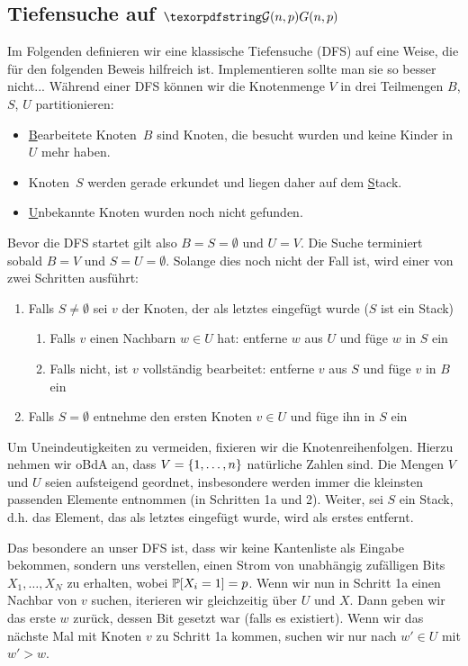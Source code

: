 \subsection{Tiefensuche auf $\Gnp$}
Im Folgenden definieren wir eine klassische Tiefensuche (DFS) auf eine Weise, die für den folgenden Beweis hilfreich ist.
Implementieren sollte man sie so besser nicht...
Während einer DFS können wir die Knotenmenge $V$ in drei Teilmengen $B$, $S$, $U$ partitionieren:
\begin{itemize}
    \item \underline Bearbeitete Knoten~$B$ sind Knoten, die besucht wurden und keine Kinder in $U$ mehr haben.
    \item Knoten~$S$ werden gerade erkundet und liegen daher auf dem \underline Stack.
    \item \underline Unbekannte Knoten wurden noch nicht gefunden.
\end{itemize}

Bevor die DFS startet gilt also $B = S = \emptyset$ und $U = V$.
Die Suche terminiert sobald $B = V$ und $S = U = \emptyset$.
Solange dies noch nicht der Fall ist, wird einer von zwei Schritten ausführt:

\begin{enumerate}
    \item Falls $S \ne \emptyset$ sei $v$ der Knoten, der als letztes eingefügt wurde ($S$ ist ein Stack)
          \begin{enumerate}
              \item Falls $v$ einen Nachbarn $w \in U$ hat: entferne $w$ aus $U$ und füge $w$ in $S$ ein
              \item Falls nicht, ist $v$ vollständig bearbeitet: entferne $v$ aus $S$ und füge $v$ in $B$ ein
          \end{enumerate}
    \item Falls $S = \emptyset$ entnehme den ersten Knoten $v \in U$ und füge ihn in $S$ ein
\end{enumerate}

Um Uneindeutigkeiten zu vermeiden, fixieren wir die Knotenreihenfolgen.
Hierzu nehmen wir oBdA an, dass $V = \left\{1, \ldots, n\right\}$ natürliche Zahlen sind.
Die Mengen $V$ und $U$ seien aufsteigend geordnet, insbesondere werden immer die kleinsten passenden Elemente entnommen (in Schritten 1a und 2).
Weiter, sei $S$ ein Stack, d.h. das Element, das als letztes eingefügt wurde, wird als erstes entfernt.

Das besondere an unser DFS ist, dass wir keine Kantenliste als Eingabe bekommen, sondern uns verstellen, einen Strom von unabhängig zufälligen Bits $X_1, \ldots, X_N$ zu erhalten, wobei $\mathbb{P}\!\left[X_i = 1\right] = p$.
Wenn wir nun in Schritt 1a einen Nachbar von $v$ suchen, iterieren wir gleichzeitig über $U$ und $X$.
Dann geben wir das erste $w$ zurück, dessen Bit gesetzt war (falls es existiert).
Wenn wir das nächste Mal mit Knoten $v$ zu Schritt 1a kommen, suchen wir nur nach $w' \in U$ mit $w' > w$.

